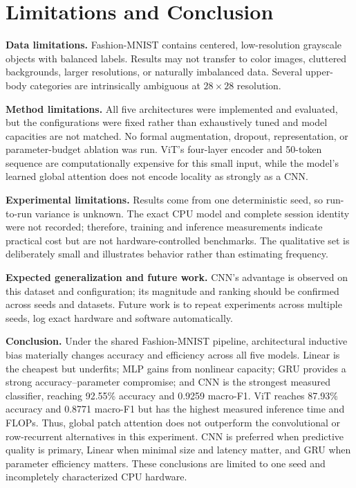 \section{Limitations and Conclusion}

\textbf{Data limitations.} Fashion-MNIST contains centered, low-resolution grayscale objects with balanced labels. Results may not transfer to color images, cluttered backgrounds, larger resolutions, or naturally imbalanced data. Several upper-body categories are intrinsically ambiguous at $28\times28$ resolution.

\textbf{Method limitations.} All five architectures were implemented and evaluated, but the configurations were fixed rather than exhaustively tuned and model capacities are not matched. No formal augmentation, dropout, representation, or parameter-budget ablation was run. ViT's four-layer encoder and 50-token sequence are computationally expensive for this small input, while the model's learned global attention does not encode locality as strongly as a CNN.

\textbf{Experimental limitations.} Results come from one deterministic seed, so run-to-run variance is unknown. The exact CPU model and complete session identity were not recorded; therefore, training and inference measurements indicate practical cost but are not hardware-controlled benchmarks. The qualitative set is deliberately small and illustrates behavior rather than estimating frequency.

\textbf{Expected generalization and future work.} CNN's advantage is observed on this dataset and configuration; its magnitude and ranking should be confirmed across seeds and datasets. Future work is to repeat experiments across multiple seeds, log exact hardware and software automatically.

\textbf{Conclusion.} Under the shared Fashion-MNIST pipeline, architectural inductive bias materially changes accuracy and efficiency across all five models. Linear is the cheapest but underfits; MLP gains from nonlinear capacity; GRU provides a strong accuracy--parameter compromise; and CNN is the strongest measured classifier, reaching 92.55\% accuracy and 0.9259 macro-F1. ViT reaches 87.93\% accuracy and 0.8771 macro-F1 but has the highest measured inference time and FLOPs. Thus, global patch attention does not outperform the convolutional or row-recurrent alternatives in this experiment. CNN is preferred when predictive quality is primary, Linear when minimal size and latency matter, and GRU when parameter efficiency matters. These conclusions are limited to one seed and incompletely characterized CPU hardware.
